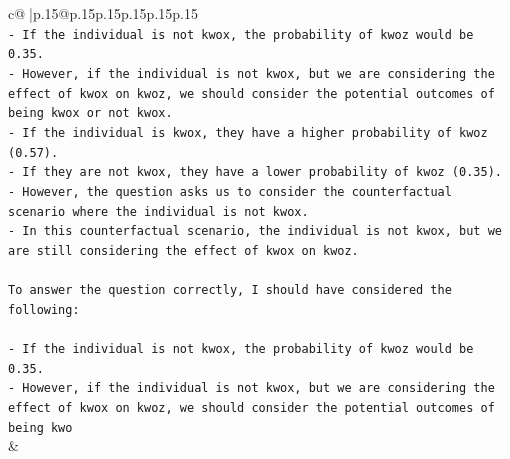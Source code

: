 \documentclass{article}
\begin{document}
{\begin{supertabular}{c@{$\;$}|p{.15\linewidth}@{}p{.15\linewidth}p{.15\linewidth}p{.15\linewidth}p{.15\linewidth}p{.15\linewidth}}
{{{\\ 
\texttt{{-} If the individual is not kwox, the probability of kwoz would be 0.35.} \\
\texttt{{-} However, if the individual is not kwox, but we are considering the effect of kwox on kwoz, we should consider the potential outcomes of being kwox or not kwox.} \\
\texttt{{-} If the individual is kwox, they have a higher probability of kwoz (0.57).} \\
\texttt{{-} If they are not kwox, they have a lower probability of kwoz (0.35).} \\
\texttt{{-} However, the question asks us to consider the counterfactual scenario where the individual is not kwox.} \\
\texttt{{-} In this counterfactual scenario, the individual is not kwox, but we are still considering the effect of kwox on kwoz.} \\
\\ 
\texttt{To answer the question correctly, I should have considered the following:} \\
\\ 
\texttt{{-} If the individual is not kwox, the probability of kwoz would be 0.35.} \\
\texttt{{-} However, if the individual is not kwox, but we are considering the effect of kwox on kwoz, we should consider the potential outcomes of being kwo} \\
            }
        }
    }
    & \\ \\

\end{supertabular}
}
\end{document}
